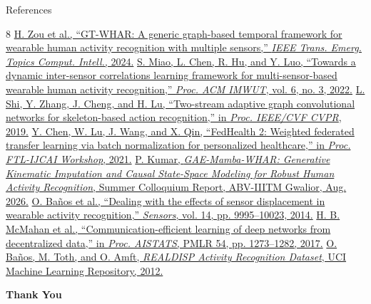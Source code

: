 \documentclass[10pt,aspectratio=169]{beamer}
\begin{document}
\begin{frame}[t]{References }
\scriptsize
\begin{thebibliography}{8}
\href{https://doi.org/10.1109/TETCI.2024.3378331}{H. Zou et al., ``GT-WHAR: A generic graph-based temporal framework for wearable human activity recognition with multiple sensors,'' \emph{IEEE Trans. Emerg. Topics Comput. Intell.}, 2024.}
\href{https://doi.org/10.1145/3550331}{S. Miao, L. Chen, R. Hu, and Y. Luo, ``Towards a dynamic inter-sensor correlations learning framework for multi-sensor-based wearable human activity recognition,'' \emph{Proc. ACM IMWUT}, vol. 6, no. 3, 2022.}
\href{https://openaccess.thecvf.com/content_CVPR_2019/html/Shi_Two-Stream_Adaptive_Graph_Convolutional_Networks_for_Skeleton-Based_Action_Recognition_CVPR_2019_paper.html}{L. Shi, Y. Zhang, J. Cheng, and H. Lu, ``Two-stream adaptive graph convolutional networks for skeleton-based action recognition,'' in \emph{Proc. IEEE/CVF CVPR}, 2019.}
\href{https://federated-learning.org/fl-ijcai-2021/FTL-IJCAI21_paper_4.pdf}{Y. Chen, W. Lu, J. Wang, and X. Qin, ``FedHealth 2: Weighted federated transfer learning via batch normalization for personalized healthcare,'' in \emph{Proc. FTL-IJCAI Workshop}, 2021.}
\href{https://github.com/ksprabhatkumar/GAE_Mamba_WHAR/blob/main/report.pdf}{P. Kumar, \emph{GAE-Mamba-WHAR: Generative Kinematic Imputation and Causal State-Space Modeling for Robust Human Activity Recognition}, Summer Colloquium Report, ABV-IIITM Gwalior, Aug. 2026.}
\href{https://doi.org/10.3390/s140609995}{O. Ba\~nos et al., ``Dealing with the effects of sensor displacement in wearable activity recognition,'' \emph{Sensors}, vol. 14, pp. 9995--10023, 2014.}
\href{https://proceedings.mlr.press/v54/mcmahan17a.html}{H. B. McMahan et al., ``Communication-efficient learning of deep networks from decentralized data,'' in \emph{Proc. AISTATS}, PMLR 54, pp. 1273--1282, 2017.}
\href{https://doi.org/10.24432/C5GP6D}{O. Ba\~nos, M. Toth, and O. Amft, \emph{REALDISP Activity Recognition Dataset}, UCI Machine Learning Repository, 2012.}
\end{thebibliography}
\end{frame}

\begin{frame}[plain]
\centering
\vfill
{\Huge\bfseries Thank You}\par
\vfill
\end{frame}
\end{document}
